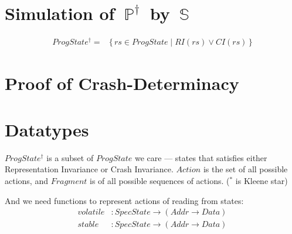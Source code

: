 \documentclass[letterpaper,twocolumn,10pt]{article}
\theoremstyle{definition}
\renewcommand{\i}[1]{\ensuremath{\mathit{#1}}}
\newcommand{\Spec}{\ensuremath{\mathbb S}}
\newcommand{\ProgInv}{\ensuremath{\mathbb P^\dagger}}
\begin{document}
\section{Simulation of~\ProgInv\ by~\Spec}
\label{sec:sim}

\begin{align*}
\i{ProgState^{\dagger}} ={} &\{\, \i{rs} \in \i{ProgState} \mid \i{RI(rs) \lor CI(rs)} \,\}
\end{align*}


\section{Proof of Crash-Determinacy}
\label{sec:proof}

\section{Datatypes}


$ProgState^\dagger$ is a subset of $ProgState$ we care \---- states that satisfies either Representation Invariance or Crash Invariance. $Action$ is the set of all possible actions, and $\i{Fragment}$ is of all possible sequences of actions. ($^*$ is Kleene star)

And we need functions to represent actions of reading from states:
\begin{align*}
	volatile &: \i{SpecState} \to (\i{Addr} \to \i{Data})\\
	stable &: \i{SpecState} \to (\i{Addr} \to \i{Data})
\end{align*}

\newpage
\end{document}
